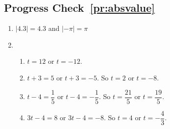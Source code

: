 \subsection*{Progress Check~\ref{pr:absvalue}}
\begin{enumerate}
  \item $|4.3| = 4.3$ and $|-\pi| = \pi$
  \item \begin{enumerate}
    \item $t = 12$ or $t = -12$.
    \item $t + 3 = 5$ or $t + 3 = -5$.  So $t = 2$ or $t = -8$.
    \item $t - 4 = \dfrac{1}{5}$ or $t - 4 = -\dfrac{1}{5}$.  So $t = \dfrac{21}{5}$ or 
$t = \dfrac{19}{5}$.
    \item $3t - 4 = 8$ or $3t - 4 = -8$.  So $t = 4$ or $t = -\dfrac{4}{3}$.
\end{enumerate}
\end{enumerate}
\hbreak

\endinput
